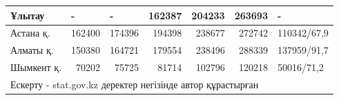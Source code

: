 \begin{table}[H]
{\begin{tabular}{|lrrrrrl|}
\multicolumn{1}{|l|}{Ұлытау} &
  \multicolumn{1}{l|}{-} &
  \multicolumn{1}{l|}{-} &
  \multicolumn{1}{r|}{162387} &
  \multicolumn{1}{r|}{204233} &
  \multicolumn{1}{r|}{263693} &
  - \\ \hline
\multicolumn{1}{|l|}{Астана қ.} &
  \multicolumn{1}{r|}{162400} &
  \multicolumn{1}{r|}{174396} &
  \multicolumn{1}{r|}{194398} &
  \multicolumn{1}{r|}{238677} &
  \multicolumn{1}{r|}{272742} &
  110342/67,9 \\ \hline
\multicolumn{1}{|l|}{Алматы қ.} &
  \multicolumn{1}{r|}{150380} &
  \multicolumn{1}{r|}{164721} &
  \multicolumn{1}{r|}{179554} &
  \multicolumn{1}{r|}{238496} &
  \multicolumn{1}{r|}{288339} &
  137959/91,7 \\ \hline
\multicolumn{1}{|l|}{Шымкент қ.} &
  \multicolumn{1}{r|}{70202} &
  \multicolumn{1}{r|}{75725} &
  \multicolumn{1}{r|}{81714} &
  \multicolumn{1}{r|}{102796} &
  \multicolumn{1}{r|}{120218} &
  50016/71,2 \\ \hline
\multicolumn{7}{|l|}{Ескерту - stat.gov.kz деректер негізінде автор құрастырған} \\ \hline
\end{tabular}%
}
\end{table}

